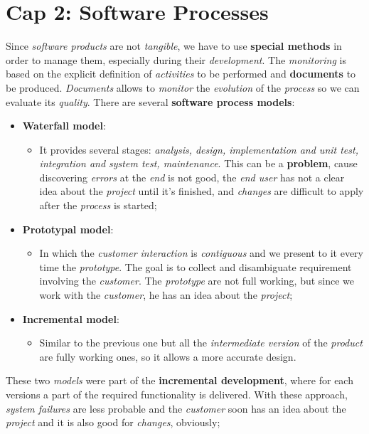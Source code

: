 \documentclass{article}
\begin{document}
\section{Cap 2: Software Processes}
Since \emph{software products} are not \emph{tangible}, we have to use \textbf{special methods} in order to manage them, especially during their \emph{development}. The \emph{monitoring} is based on the explicit definition of \emph{activities} to be performed and \textbf{documents} to be produced. \emph{Documents} allows to \emph{monitor} the \emph{evolution} of the \emph{process} so we can evaluate its \emph{quality}. There are several \textbf{software process models}:
\begin{itemize}
\item \textbf{Waterfall model}: 
\begin{itemize}
\item It provides several stages: \emph{analysis, design, implementation and unit test, integration and system test, maintenance}. This can be a \textbf{problem}, cause discovering \emph{errors} at the \emph{end} is not good, the \emph{end user} has not a clear idea about the \emph{project} until it's finished, and \emph{changes} are difficult to apply after the \emph{process} is started;
\end{itemize}
\item \textbf{Prototypal model}:
\begin{itemize}
\item In which the \emph{customer interaction} is \emph{contiguous} and we present to it every time the \emph{prototype}. The goal is to collect and disambiguate requirement involving the \emph{customer}. The \emph{prototype} are not full working, but since we work with the \emph{customer}, he has an idea about the \emph{project}; 
\end{itemize}
\item \textbf{Incremental model}:
\begin{itemize}
\item Similar to the previous one but all the \emph{intermediate version} of the \emph{product} are fully working ones, so it allows a more accurate design.
\end{itemize} 
\end{itemize}
These two \emph{models} were part of the \textbf{incremental development}, where for each versions a part of the required functionality is delivered. With these approach, \emph{system failures} are less probable and the \emph{customer} soon has an idea about the \emph{project} and it is also good for \emph{changes}, obviously;
\end{document}
